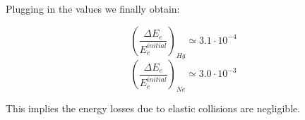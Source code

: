 \documentclass{scrartcl}
\begin{document}
Plugging in the values we finally obtain:

\[ \left( \frac{\Delta E_e}{E_e^{initial}} \right)_{Hg} \simeq 3.1 \cdot 10^{-4}\]
\[ \left( \frac{\Delta E_e}{E_e^{initial}} \right)_{Ne} \simeq 3.0 \cdot 10^{-3}\]

This implies the energy losses due to elastic collisions are negligible.

\printbibliography
\end{document}

